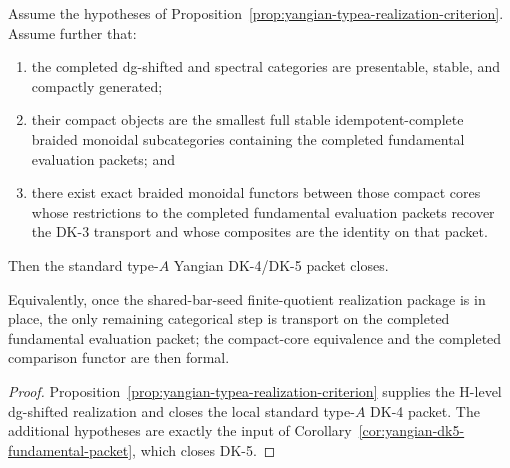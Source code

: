 \begin{corollary}
\label{cor:yangian-typea-realization-plus-fundamental-packet-orig}
Assume the hypotheses of
Proposition~\ref{prop:yangian-typea-realization-criterion}. Assume
further that:
\begin{enumerate}[label=\textup{(\roman*)}]
\item the completed dg-shifted and spectral categories are presentable,
 stable, and compactly generated;
\item their compact objects are the smallest full stable
 idempotent-complete braided monoidal subcategories containing the
 completed fundamental evaluation packets; and
\item there exist exact braided monoidal functors between those compact
 cores whose restrictions to the completed fundamental evaluation
 packets recover the DK-3 transport and whose composites are the
 identity on that packet.
\end{enumerate}
Then the standard type-$A$ Yangian DK-4/DK-5 packet closes.

Equivalently, once the shared-bar-seed finite-quotient realization
package is in place, the only remaining categorical step is transport
on the completed fundamental evaluation packet; the compact-core
equivalence and the completed comparison functor are then formal.
\end{corollary}

\begin{proof}
Proposition~\ref{prop:yangian-typea-realization-criterion} supplies the
H-level dg-shifted realization and closes the local standard type-$A$
DK-4 packet. The additional hypotheses are exactly the input of
Corollary~\ref{cor:yangian-dk5-fundamental-packet}, which closes DK-5.
\end{proof}

